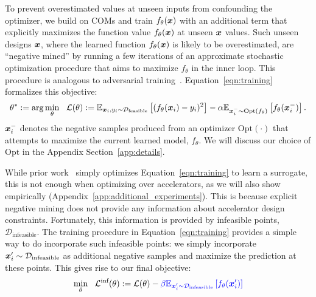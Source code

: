 %
To prevent overestimated values at unseen inputs from confounding the optimizer, we build on COMs \citep{trabucco2021conservative} and train $f_\theta({\boldsymbol{x}})$ with an additional term that explicitly maximizes the function value $f_\theta({\boldsymbol{x}})$ at unseen ${\boldsymbol{x}}$ values.
%
Such unseen designs ${\boldsymbol{x}}$, where the learned function $f_\theta({\boldsymbol{x}})$ is likely to be overestimated, are ``negative mined'' by running a few iterations of an approximate stochastic optimization procedure that aims to maximize $f_\theta$ in the inner loop. This procedure is analogous to adversarial training~\citep{goodfellow2014explaining}. Equation~\ref{eqn:training} formalizes this objective:
\newcommand{\editcolor}{black}
\begin{equation}
\label{eqn:training}
    \theta^* := \arg \min_\theta~~ \mathcal{L}(\theta):= \E_{\rvx_i, y_i \sim \mathcal{D}_{\text{feasible}}} \left[ (f_\theta(\rvx_i) - y_i)^2 \right] - \alpha \E_{\rvx^{-}_i \sim \textcolor{\editcolor}{\mathrm{Opt}(f_\theta)}} \left[f_\theta(\rvx^-_i) \right].
\end{equation}
\vspace{-0.1in}
${\boldsymbol{x}}^{-}_i$ denotes the negative samples produced from an optimizer $\mathrm{Opt}(\cdot)$ that attempts to maximize the current learned model, $f_\theta$. %
We will discuss our choice of $\mathrm{Opt}$ in the Appendix Section~\ref{app:details}.  
 
%
While prior work~\citep{trabucco2021conservative} simply optimizes Equation~\ref{eqn:training} to learn a surrogate, this is not enough when optimizing over accelerators, as we will also show empirically (Appendix~\ref{app:additional_experiments}).
%
This is because explicit negative mining does not provide any information about accelerator design constraints. Fortunately, this information is provided by infeasible points, $\mathcal{D}_\text{infeasible}$. The training procedure in Equation~\ref{eqn:training} provides a simple way to do incorporate such infeasible points: we simply incorporate ${\boldsymbol{x}}'_i \sim \mathcal{D}_{\text{infeasible}}$ as additional negative samples and maximize the prediction at these points.
This gives rise to our final objective:
\begin{equation}
\label{eqn:final_training}
    \min_\theta~~ \mathcal{L}^\text{inf}(\theta) := \mathcal{L}(\theta)
    - \textcolor{blue}{\beta \mathbb{E}_{{\boldsymbol{x}}'_i \sim \mathcal{D}_{\text{infeasible}}}\left[ f_\theta({\boldsymbol{x}}'_i) \right]}
\end{equation}

